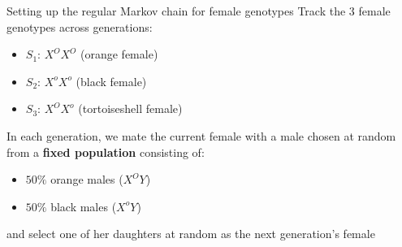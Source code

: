 \documentclass[aspectratio=169]{beamer}\usepackage[]{graphicx}\usepackage[]{xcolor}
\begin{document}
\begin{frame}{Setting up the regular Markov chain for female genotypes}
Track the 3 female genotypes across generations:
\begin{itemize}
\item $S_1$: $X^O X^O$ (orange female)
\item $S_2$: $X^o X^o$ (black female)
\item $S_3$: $X^O X^o$ (tortoiseshell female)
\end{itemize}
\vfill
In each generation, we mate the current female with a male chosen at random from a \textbf{fixed population} consisting of:
\begin{itemize}
\item $50\%$ orange males ($X^O Y$)
\item $50\%$ black males ($X^o Y$)
\end{itemize}
and select one of her daughters at random as the next generation's female
\end{frame}
\end{document}
